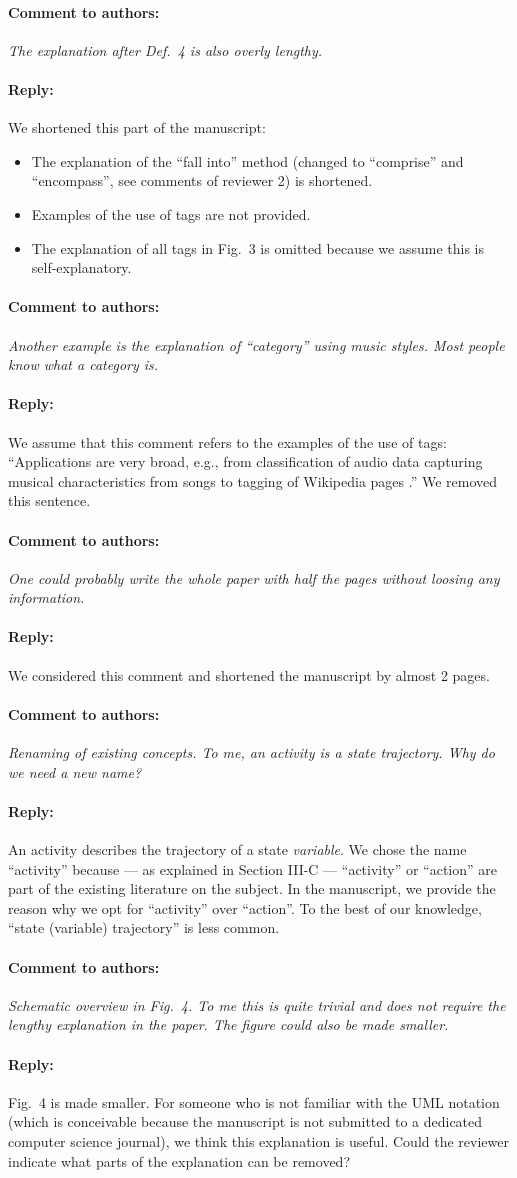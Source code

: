 \documentclass[10pt,final,a4paper,oneside,onecolumn]{article}
\renewcommand{\cite}[1]{\parencite{#1}}
\newcommand{\toauthor}{\paragraph*{Comment to authors:} \itshape}
\newcommand{\fromauthor}{\paragraph*{Reply:} \normalfont}
\newcommand{\cstart}{\cbstart\color{red}}
\newcommand{\cend}{\cbend\color{black}}
\begin{document}
\toauthor The explanation after Def.~4 is also overly lengthy. 

\fromauthor We shortened this part of the manuscript:
\begin{itemize}
	\item The explanation of the ``fall into'' method (changed to \cstart ``comprise'' \cend and \cstart ``encompass''\cend, see comments of reviewer 2) is shortened.
	\item Examples of the use of tags are not provided.
	\item The explanation of all tags in Fig.~3 is omitted because we assume this is self-explanatory.
\end{itemize}

\toauthor Another example is the explanation of ``category'' using music styles. Most people know what a category is.  

\fromauthor We assume that this comment refers to the examples of the use of tags: ``Applications are very broad, e.g., from classification of audio data \cite{kong2017joint} capturing musical characteristics from songs \cite{ellis2011semantic} to tagging of Wikipedia pages \cite{voss2006collaborative}.'' We removed this sentence.

\toauthor One could probably write the whole paper with half the pages without loosing any information.

\fromauthor We considered this comment and shortened the manuscript by almost 2 pages.

\toauthor Renaming of existing concepts. To me, an activity is a state trajectory. Why do we need a new name?

\fromauthor An activity describes the trajectory of a state \emph{variable}. We chose the name ``activity'' because --- as explained in Section III-C --- ``activity'' \cite{elrofai2018scenario,catapult2018musicc} or ``action'' \cite{ulbrich2015} are part of the existing literature on the subject. In the manuscript, we provide the reason why we opt for ``activity'' over ``action''. To the best of our knowledge, ``state (variable) trajectory'' is less common.

\toauthor Schematic overview in Fig.~4. To me this is quite trivial and does not require the lengthy explanation in the paper. The figure could also be made smaller.

\fromauthor Fig.~4 is made smaller. For someone who is not familiar with the UML notation (which is conceivable because the manuscript is not submitted to a dedicated computer science journal), we think this explanation is useful. Could the reviewer indicate what parts of the explanation can be removed?
\end{document}
